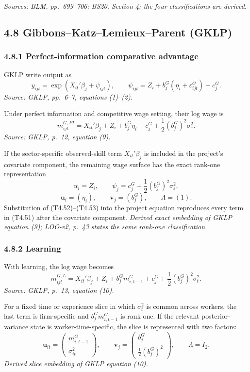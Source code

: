 \documentclass[11pt]{article}
\begin{document}
\textit{Sources: BLM, pp.\ 699--706; BS20, Section 4; the four classifications
are derived.}

\subsection{4.8 Gibbons--Katz--Lemieux--Parent (GKLP)}

\subsubsection{4.8.1 Perfect-information comparative advantage}

GKLP write output as
\[
y_{ijt}
=
\exp(X_{it}'\beta_j+\psi_{ijt}),
\qquad
\psi_{ijt}
=
Z_i+b_j^G(\eta_i+\varepsilon_{ijt}^G)+c_j^G.
\tag{T4.50}
\]
\textit{Source: GKLP, pp.\ 6--7, equations (1)--(2).}

Under perfect information and competitive wage setting, their log wage is
\[
m_{ijt}^{G,PI}
=
X_{it}'\beta_j
+Z_i
+b_j^G\eta_i
+c_j^G
+\frac12(b_j^G)^2\sigma_\varepsilon^2.
\tag{T4.51}
\]
\textit{Source: GKLP, p.\ 12, equation (9).}

If the sector-specific observed-skill term \(X_{it}'\beta_j\) is included in
the project's covariate component, the remaining wage surface has the exact
rank-one representation
\[
\alpha_i=Z_i,
\qquad
\psi_j=c_j^G+\frac12(b_j^G)^2\sigma_\varepsilon^2,
\tag{T4.52}
\]
\[
\mathbf u_i=(\eta_i),
\qquad
\mathbf v_j=(b_j^G),
\qquad
\Lambda=(1).
\tag{T4.53}
\]
Substitution of (T4.52)--(T4.53) into the project equation reproduces every
term in (T4.51) after the covariate component.
\textit{Derived exact embedding of GKLP equation (9); LOO-v2, p.\ 43 states
the same rank-one classification.}

\subsubsection{4.8.2 Learning}

With learning, the log wage becomes
\[
m_{ijt}^{G,L}
=
X_{it}'\beta_j
+Z_i
+b_j^Gm_{i,t-1}^G
+c_j^G
+\frac12(b_j^G)^2\sigma_t^2.
\tag{T4.54}
\]
\textit{Source: GKLP, p.\ 13, equation (10).}

For a fixed time or experience slice in which \(\sigma_t^2\) is common across
workers, the last term is firm-specific and
\(b_j^Gm_{i,t-1}^G\) is rank one.  If the relevant posterior-variance state is
worker-time-specific, the slice is represented with two factors:
\[
\mathbf u_{it}
=
\begin{pmatrix}
m_{i,t-1}^G\\
\sigma_{it}^2
\end{pmatrix},
\qquad
\mathbf v_j
=
\begin{pmatrix}
b_j^G\\
\frac12(b_j^G)^2
\end{pmatrix},
\qquad
\Lambda=I_2.
\tag{T4.55}
\]
\textit{Derived slice embedding of GKLP equation (10).}
\end{document}
